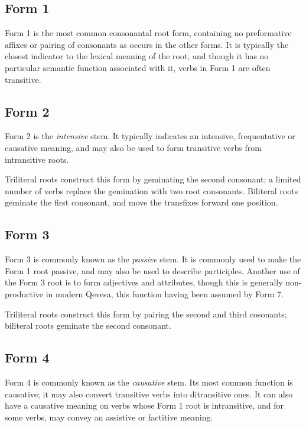 \documentclass[grammar]{subfiles}
\begin{document}
  \subsection{Form 1}
  \label{ssec:dev_verb_form_1}

  Form 1 is the most common consonantal root form, containing no preformative affixes or pairing of consonants as occurs in the other forms. It is typically the closest indicator to the lexical meaning of the root, and though it has no particular semantic function associated with it, verbs in Form 1 are often transitive.

  \subsection{Form 2}
  \label{ssec:dev_verb_form_2}

  Form 2 is the \emph{intensive} stem. It typically indicates an intensive, frequentative or causative meaning, and may also be used to form transitive verbs from intransitive roots. 

  Triliteral roots construct this form by geminating the second consonant; a limited number of verbs replace the gemination with two root consonants. %
  Biliteral roots geminate the first consonant, and move the transfixes forward one position. 

  \subsection{Form 3}
  \label{ssec:dev_verb_form_3}

  Form 3 is commonly known as the \emph{passive} stem.
  It is commonly used to make the Form 1 root passive, and may also be used to describe participles.
  Another use of the Form 3 root is to form adjectives and attributes, though this is generally non-productive in modern Qevesa, this function having been assumed by Form 7.

  Triliteral roots construct this form by pairing the second and third cosonants; biliteral roots geminate the second consonant.

  \subsection{Form 4}
  \label{ssec:dev_verb_form_4}

  Form 4 is commonly known as the \emph{causative} stem. 
  Its most common function is causative; it may also convert transitive verbs into ditransitive ones.
  It can also have a causative meaning on verbs whose Form 1 root is intransitive, and for some verbs, may convey an assistive or factitive meaning.
\end{document}
